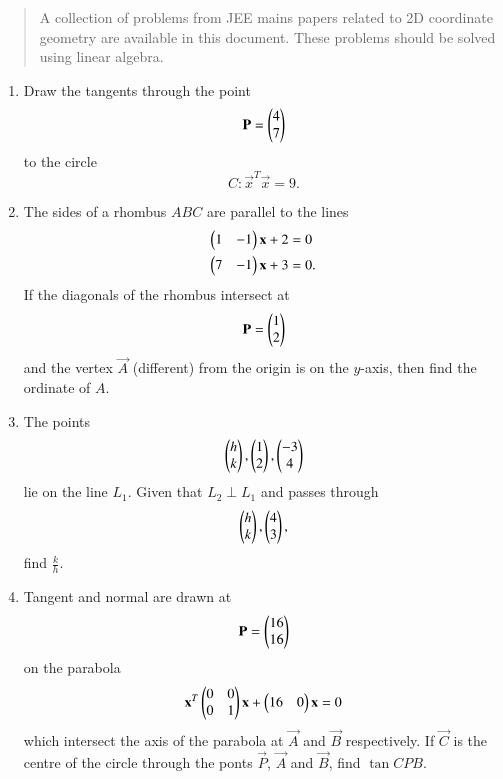 \documentclass[journal,12pt,twocolumn]{IEEEtran}
\begin{document}
\begin{abstract}
	A  collection of problems from JEE mains papers related to 2D coordinate geometry are 
available in this document.  These problems should be solved using linear algebra.
\end{abstract}
\begin{enumerate}[label=\arabic*.]
\item Draw the tangents through the point 
\begin{equation}
\label{eq:circle_3_p}
\mathbf{P} = \begin{pmatrix}4\\7\end{pmatrix} 
\end{equation}
to the circle
\begin{equation}
\label{eq:circle_3}
C: \vec{x}^T\vec{x}  = 9.
\end{equation}
\item The sides of a rhombus $ABC$ are parallel to the lines
\begin{align}
\begin{pmatrix}1 & -1\end{pmatrix}\mathbf{x} + 2 &=0
\\
\begin{pmatrix}7 & -1\end{pmatrix}\mathbf{x} + 3 &=0.
\end{align}
If the diagonals of the rhombus intersect at
\begin{align}
\mathbf{P} = \begin{pmatrix}1 \\ 2\end{pmatrix}
\end{align}
and the vertex $\vec{A}$ (different) from the origin is on the $y$-axis, then find the ordinate of $A$.
\item The points 
%
\begin{align}
\begin{pmatrix}h \\ k\end{pmatrix},\begin{pmatrix}1 \\ 2\end{pmatrix},\begin{pmatrix}-3 \\ 4\end{pmatrix}
\end{align}
%
lie on the line $L_1$. Given that $L_2 \perp L_1$ and passes through 
\begin{align}
\begin{pmatrix}h \\ k\end{pmatrix},\begin{pmatrix}4 \\ 3\end{pmatrix},
\end{align}
find $\frac{k}{h}$.
%
\item Tangent and normal are drawn at 
\begin{equation}
\mathbf{P}= \begin{pmatrix}16 \\ 16\end{pmatrix}
\end{equation}
on the parabola 
\begin{equation}
\mathbf{x}^T\begin{pmatrix}0 & 0 \\ 0 & 1\end{pmatrix}\mathbf{x} + \begin{pmatrix}16 & 0\end{pmatrix}\mathbf{x} =0
\end{equation}
%
which intersect the axis of the parabola at $\vec{A}$ and $\vec{B}$ respectively.  If $\vec{C}$ is the centre 
of the circle through the ponts $\vec{P}$, $\vec{A}$ and $\vec{B}$, find $\tan  CPB$.


\end{enumerate}
\end{document}
